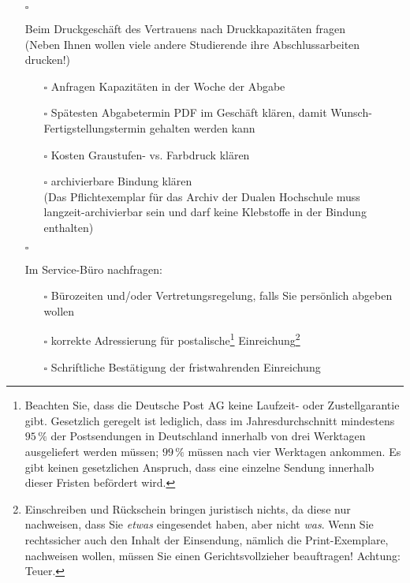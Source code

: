 \begin{itemize}
{        \begin{itemize}
             \item[$\square$]{
                Beim Druckgeschäft des Vertrauens nach Druckkapazitäten fragen\\
                (Neben Ihnen wollen viele andere Studierende ihre Abschlussarbeiten drucken!)
                \begin{itemize}
                    \item[$\square$] Anfragen Kapazitäten in der Woche der Abgabe
                    \item[$\square$] Spätesten Abgabetermin PDF im Geschäft klären, damit Wunsch-Fer\-tig\-stel\-lungs\-ter\-min gehalten werden kann
                    \item[$\square$] Kosten Graustufen- vs. Farbdruck klären
                    \item[$\square$]{
                        archivierbare Bindung klären\\
                        (Das Pflichtexemplar für das Archiv der Dualen Hochschule muss langzeit-ar\-chi\-vier\-bar sein und darf keine Klebstoffe in der Bindung enthalten)
                    }
                \end{itemize}
            }
            \item[$\square$]{
                Im Service-Büro nachfragen:
                \begin{itemize}
                    \item[$\square$] Bürozeiten und/oder Vertretungsregelung, falls Sie persönlich abgeben wollen
                    \item[$\square$] korrekte Adressierung für postalische\footnote{Beachten Sie, dass die Deutsche Post AG keine Laufzeit- oder Zustellgarantie gibt. Gesetzlich geregelt ist lediglich, dass im Jahresdurchschnitt mindestens $95\,\%$ der Postsendungen in Deutschland innerhalb von drei Werktagen ausgeliefert werden müssen; $99\,\%$ müssen nach vier Werktagen ankommen. Es gibt keinen gesetzlichen Anspruch, dass eine einzelne Sendung innerhalb dieser Fristen befördert wird.} Einreichung\footnote{Einschreiben und Rückschein bringen juristisch nichts, da diese nur nachweisen, dass Sie \emph{etwas} eingesendet haben, aber nicht \emph{was}. Wenn Sie rechtssicher auch den Inhalt der Einsendung, nämlich die Print-Exemplare, nachweisen wollen, müssen Sie einen Gerichtsvollzieher beauftragen! Achtung: Teuer.}
                    \item[$\square$] Schriftliche Bestätigung der fristwahrenden Einreichung

\end{itemize}}
\end{itemize}}
\end{itemize}
